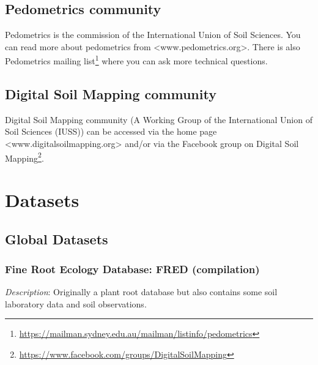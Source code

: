 \documentclass[
  graybox,natbib,nospthms]{svmono}
\renewcommand{\href}[2]{#2 (\url{#1})}
\renewcommand{\href}[2]{#2\footnote{\url{#1}}}
\begin{document}
\hypertarget{pedometrics-community}{%
\section{Pedometrics community}\label{pedometrics-community}}

Pedometrics is the commission of the International Union of Soil Sciences. You can
read more about pedometrics from \textless www.pedometrics.org\textgreater. There is also \href{https://mailman.sydney.edu.au/mailman/listinfo/pedometrics}{Pedometrics
mailing list} where you
can ask more technical questions.

\hypertarget{digital-soil-mapping-community}{%
\section{Digital Soil Mapping community}\label{digital-soil-mapping-community}}

Digital Soil Mapping community (A Working Group of the International Union of Soil Sciences (IUSS))
can be accessed via the home page \textless www.digitalsoilmapping.org\textgreater{} and/or
via the Facebook group on \href{https://www.facebook.com/groups/DigitalSoilMapping}{Digital Soil Mapping}.

\hypertarget{datasets}{%
\chapter{Datasets}\label{datasets}}

\hypertarget{global-datasets}{%
\section{Global Datasets}\label{global-datasets}}

\hypertarget{fine-root-ecology-database-fred-compilation}{%
\subsection{Fine Root Ecology Database: FRED (compilation)}\label{fine-root-ecology-database-fred-compilation}}

\emph{Description}: Originally a plant root database but also contains some soil laboratory data
and soil observations.
\end{document}
